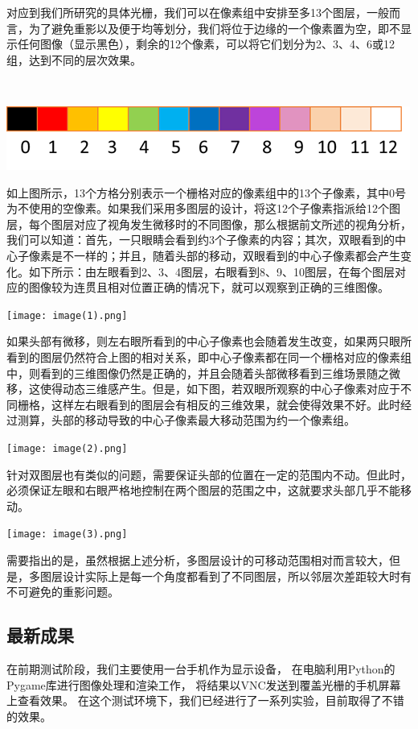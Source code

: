 \documentclass[12pt,a4paper]{article}
\begin{document}
对应到我们所研究的具体光栅，我们可以在像素组中安排至多13个图层，一般而言，为了避免重影以及便于均等划分，我们将位于边缘的一个像素置为空，即不显示任何图像（显示黑色），剩余的12个像素，可以将它们划分为2、3、4、6或12组，达到不同的层次效果。

~

{    \hfill\includegraphics[width=0.4\linewidth]{image}\hfill}

如上图所示，13个方格分别表示一个栅格对应的像素组中的13个子像素，其中0号为不使用的空像素。如果我们采用多图层的设计，将这12个子像素指派给12个图层，每个图层对应了视角发生微移时的不同图像，那么根据前文所述的视角分析，我们可以知道：首先，一只眼睛会看到约3个子像素的内容；其次，双眼看到的中心子像素是不一样的；并且，随着头部的移动，双眼看到的中心子像素都会产生变化。如下所示：由左眼看到2、3、4图层，右眼看到8、9、10图层，在每个图层对应的图像较为连贯且相对位置正确的情况下，就可以观察到正确的三维图像。

{    \hfill\texttt{[image: image(1).png]}\hfill}

如果头部有微移，则左右眼所看到的中心子像素也会随着发生改变，如果两只眼所看到的图层仍然符合上图的相对关系，即中心子像素都在同一个栅格对应的像素组中，则看到的三维图像仍然是正确的，并且会随着头部微移看到三维场景随之微移，这使得动态三维感产生。但是，如下图，若双眼所观察的中心子像素对应于不同栅格，这样左右眼看到的图层会有相反的三维效果，就会使得效果不好。此时经过测算，头部的移动导致的中心子像素最大移动范围为约一个像素组。

{    \hfill\texttt{[image: image(2).png]}\hfill}

针对双图层也有类似的问题，需要保证头部的位置在一定的范围内不动。但此时，必须保证左眼和右眼严格地控制在两个图层的范围之中，这就要求头部几乎不能移动。

{    \hfill\texttt{[image: image(3).png]}\hfill}

需要指出的是，虽然根据上述分析，多图层设计的可移动范围相对而言较大，但是，多图层设计实际上是每一个角度都看到了不同图层，所以邻层次差距较大时有不可避免的重影问题。


\subsection{最新成果}

在前期测试阶段，我们主要使用一台手机作为显示设备，
在电脑利用Python的Pygame库进行图像处理和渲染工作，
将结果以VNC发送到覆盖光栅的手机屏幕上查看效果。
在这个测试环境下，我们已经进行了一系列实验，目前取得了不错的效果。
\end{document}

